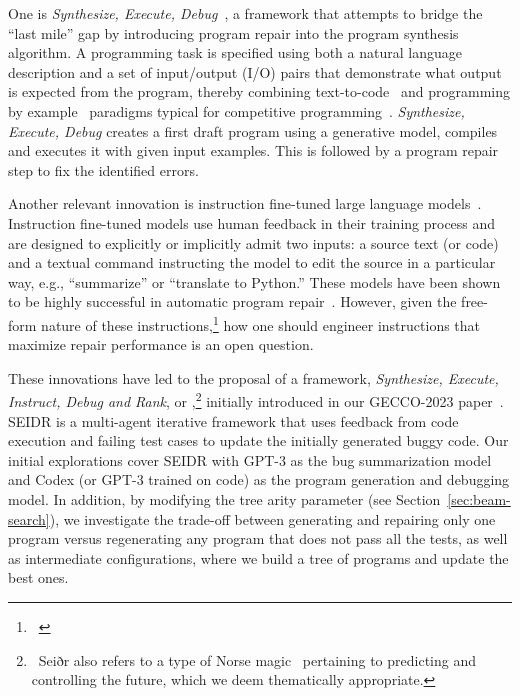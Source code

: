 One is \emph{Synthesize, Execute, Debug}~\cite{gupta2020:synthesize}, a framework that attempts to bridge the ``last mile'' gap by introducing program repair into the program synthesis algorithm. 
A programming task is specified using both a natural language description and a set of input/output (I/O) pairs that demonstrate what output is expected from the program, thereby combining text-to-code~\cite{iyer2018:mapping} and programming by example~\cite{halbert1984:programming,gulwani2016:programming} paradigms typical for competitive programming~\cite{zavershynskyi2018:naps}.
\emph{Synthesize, Execute, Debug} creates a first draft program using a generative model, compiles and executes it with given input examples.
This is followed by a program repair step to fix the identified errors.

Another relevant innovation is instruction fine-tuned large language models~\cite{zhang2024:instruction}. Instruction fine-tuned models use human feedback in their training process and are designed to explicitly or implicitly admit two inputs: a source text (or code) and a textual command instructing the model to edit the source in a particular way, e.g., ``summarize'' or ``translate to Python.''
These models have been shown to be highly successful in automatic program repair~\cite{fan2023:automated}. 
However, given the free-form nature of these instructions,\footnote{~} how one should engineer instructions that maximize repair performance is an open question. 

These innovations have led to the proposal of a framework, \emph{Synthesize, Execute, Instruct, Debug and Rank}, or \method{},\footnote{~Seiðr also refers to a type of Norse magic~\cite{blain2002:nine} pertaining to predicting and controlling the future, which we deem thematically appropriate.} initially introduced in our GECCO-2023 paper~\cite{liventsev2023:fully}. 
SEIDR is a multi-agent iterative framework that uses feedback from code execution and failing test cases to update the initially generated buggy code. 
Our initial explorations cover SEIDR with GPT-3 as the bug summarization model and Codex (or GPT-3 trained on code) as the program generation and debugging model.  
In addition, by modifying the tree arity parameter (see Section~\ref{sec:beam-search}), we investigate the trade-off between generating and repairing only one program versus regenerating any program that does not pass all the tests, as well as intermediate configurations, where we build a tree of programs and update the best ones.

